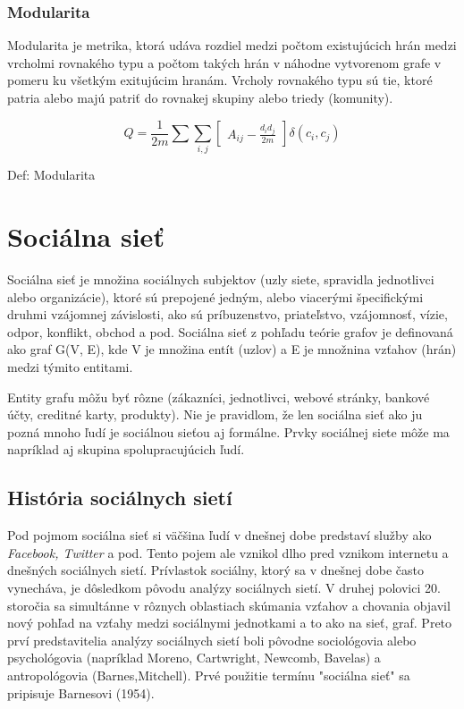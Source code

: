 \documentclass[slovak,master,public,dept460,male,cpdeclaration,oneside]{diploma}
\begin{document}
\newpage
\subsubsection{Modularita}
Modularita je metrika, ktorá udáva rozdiel medzi počtom existujúcich hrán medzi vrcholmi rovnakého typu a počtom takých hrán v náhodne vytvorenom grafe v pomeru ku všetkým exitujúcim hranám. Vrcholy rovnakého typu sú tie, ktoré patria alebo majú patriť do rovnakej skupiny alebo triedy (komunity).

\begin{mycapequ}[!ht]
      \begin{equation*}    
{
Q = \frac{1}{2m}\sum \sum_{i,j}\begin{bmatrix}
A_{ij} - \frac{d_{i}d_{j}}{2m}
\end{bmatrix} \delta (c_{i}, c_{j})
}
   \end{equation*}
   \caption{Def: Modularita}
\end{mycapequ}


\section{Sociálna sieť}

Sociálna sieť je množina sociálnych subjektov (uzly siete, spravidla jednotlivci alebo organizácie),
ktoré sú prepojené jedným, alebo viacerými špecifickými druhmi vzájomnej závislosti, ako sú príbuzenstvo, priateľstvo, vzájomnosť, vízie, odpor, konflikt, obchod a pod.
Sociálna sieť z pohľadu teórie grafov je definovaná ako graf G(V, E), kde V je množina entít
(uzlov) a E je množnina vzťahov (hrán) medzi týmito entitami.

Entity grafu môžu byť rôzne (zákazníci, jednotlivci, webové stránky, bankové účty, creditné karty,
produkty). Nie je pravidlom, že len sociálna sieť ako ju pozná mnoho ľudí je sociálnou sieťou aj formálne. Prvky sociálnej siete môže ma napríklad aj skupina spolupracujúcich ľudí. 

\subsection{História sociálnych sietí}

Pod pojmom sociálna sieť si väčšina ľudí v dnešnej dobe predstaví služby ako \textit{Facebook, Twitter} a pod. Tento pojem ale vznikol dlho pred vznikom internetu a dnešných sociálnych sietí. Prívlastok sociálny, ktorý sa v dnešnej dobe často vynecháva, je dôsledkom pôvodu analýzy sociálnych sietí. V druhej polovici 20. storočia sa simultánne v rôznych oblastiach skúmania vzťahov a chovania objavil nový pohľad na vzťahy medzi sociálnymi jednotkami a to ako na sieť, graf. Preto prví predstavitelia analýzy sociálnych sietí boli pôvodne sociológovia alebo psychológovia (napríklad Moreno, Cartwright, Newcomb, Bavelas) a antropológovia (Barnes,Mitchell). Prvé použitie termínu "sociálna sieť" sa pripisuje Barnesovi (1954).
\end{document}
